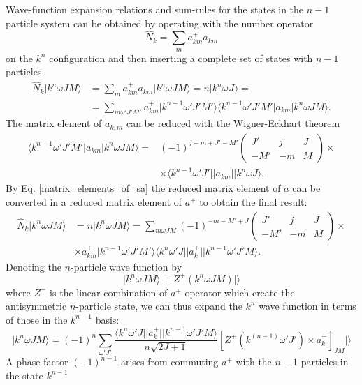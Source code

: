 \documentclass[
12pt, %
oneside, %
english, %
doublespacing, %
doublespacing, %
toctotoc, %
parskip, %
headsepline, %
]{MastersDoctoralThesis} %
\begin{document}
Wave-function expansion relations and sum-rules for the states in the $n-1$ particle system can be obtained by operating with the number operator
\begin{equation}
\hat{N}_k=\sum_m {a}^{+}_{km} {a}_{km}
\end{equation}
on the $k^n$ configuration and then inserting a complete set of states with $n-1$ particles
\begin{align}
\hat{N}_k \vert  k^{n} \omega J M   \rangle   
  &=\sum_m {a}^{+}_{km} {a}_{km} \vert  k^{n} \omega  J M \rangle
   =   n \vert  k^{n} \omega^{} J^{}   \rangle =  \nonumber \\
  &=
  \sum_{m\omega' J' M'}  {a}^{+}_{km} 
  \vert k^{n-1} \omega' J' M' \rangle
  \langle k^{n-1} \omega' J' M'  \vert
  {a}_{km} \vert k^{n} \omega J M \rangle.
\end{align}
The matrix element of $a_{k,m}$ can be reduced with the Wigner-Eckhart theorem
\begin{align}
 \langle k^{n-1} \omega' J' M'  \vert
  {a}_{km} \vert k^{n} \omega J M \rangle = &
  (-1)^{j-m+J'-M'} 
  \begin{pmatrix}
  J' & j & J \\ 
  -M' & -m & M
  \end{pmatrix} \times \nonumber \\
  & \times
  \langle k^{n-1} \omega' J' \vert \vert
  {a}_{km} \vert  \vert k^{n} \omega J  \rangle.
\end{align}
By Eq. \ref{matrix_elements_of_sa} the reduced matrix element of $\tilde{a}$ can be converted in a reduced matrix element of $a^+$ to obtain the final result:
\begin{align}
\hat{N}_k \vert  k^{n} \omega J M   \rangle   &= n \vert  k^{n} \omega J M   \rangle = 
\sum_{m\omega J M} (-1)^{-m-M'+J} 
\begin{pmatrix}
  J' & j & J \\ 
  -M' & -m & M
  \end{pmatrix} \times \nonumber \\
  & \times 
   {a}^{+}_{km} 
  \vert k^{n-1} \omega' J' M' \rangle
  \langle k^{n} \omega' J   \vert \vert
  {a}_{k}^+ 
  \vert \vert
   k^{n-1} \omega' J' M \rangle.
   \label{knmo_basis}
\end{align}
Denoting the $n$-particle wave function by
\begin{equation}
\vert k^n \omega J M \rangle \equiv Z^+ (k^n \omega J M ) \vert	 \rangle
\end{equation}
where $Z^+$ is the linear combination of $a^+$ operator which create the antisymmetric $n$-particle state,
we can thus expand the $k^n$ wave function in terms of those in the $k^{n-1}$ basis:
\begin{equation}
\vert  k^{n} \omega J M   \rangle = 
(-1)^n \sum_{\omega'J'} 
\frac{\langle k^{n} \omega' J   \vert \vert
  {a}_{k}^+ 
  \vert \vert
   k^{n-1} \omega' J' M \rangle }{n\sqrt{2J+1}}
   \left[ Z^+ (k^{(n-1)} \omega' J') \times a^+_k \right]_{JM} \vert \rangle
\end{equation}
A phase factor $(-1)^{n-1}$ arises from commuting $a^+$ with the $n-1$ particles in the state $k^{n-1}$
\end{document}
